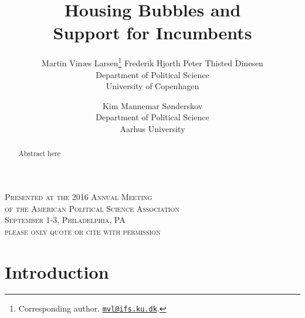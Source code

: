 \documentclass[12pt,a4paper]{article}
\title{\textbf{Housing Bubbles and \\Support for Incumbents}}
\author{Martin Vinæs Larsen\thanks{Corresponding author. \href{mailto:mvl@ifs.ku.dk}{\texttt{mvl@ifs.ku.dk}}. } \qquad Frederik Hjorth \qquad Peter Thisted  Dinesen \\Department of Political Science \\ University of Copenhagen \and Kim Mannemar  Sønderskov  \\Department of Political Science \\ Aarhus University   }
\begin{document}
\maketitle

\begin{center}
	\textsc{Presented at the 2016 Annual Meeting  \\
	of the American Political Science Association \\
	September 1-3, Philadelphia, PA \\[1em]
	please only quote or cite with permission}
\end{center}

\begin{abstract} Abstract here
\noindent %
 
\end{abstract}



\newpage

\doublespacing

\section{Introduction}
\end{document}
